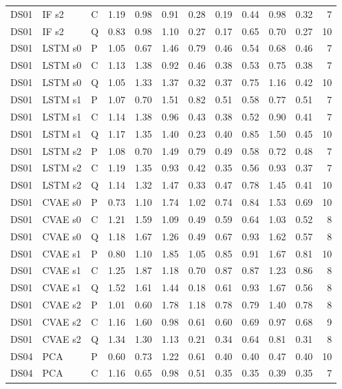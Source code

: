 \documentclass[10pt]{article}
\begin{document}
{\begin{longtable}{lllrrrrrrrrr}
DS01 & IF s2 & C & 1.19 & 0.98 & 0.91 & 0.28 & 0.19 & 0.44 & 0.98 & 0.32 & 7 \\
DS01 & IF s2 & Q & 0.83 & 0.98 & 1.10 & 0.27 & 0.17 & 0.65 & 0.70 & 0.27 & 10 \\
DS01 & LSTM s0 & P & 1.05 & 0.67 & 1.46 & 0.79 & 0.46 & 0.54 & 0.68 & 0.46 & 7 \\
DS01 & LSTM s0 & C & 1.13 & 1.38 & 0.92 & 0.46 & 0.38 & 0.53 & 0.75 & 0.38 & 7 \\
DS01 & LSTM s0 & Q & 1.05 & 1.33 & 1.37 & 0.32 & 0.37 & 0.75 & 1.16 & 0.42 & 10 \\
DS01 & LSTM s1 & P & 1.07 & 0.70 & 1.51 & 0.82 & 0.51 & 0.58 & 0.77 & 0.51 & 7 \\
DS01 & LSTM s1 & C & 1.14 & 1.38 & 0.96 & 0.43 & 0.38 & 0.52 & 0.90 & 0.41 & 7 \\
DS01 & LSTM s1 & Q & 1.17 & 1.35 & 1.40 & 0.23 & 0.40 & 0.85 & 1.50 & 0.45 & 10 \\
DS01 & LSTM s2 & P & 1.08 & 0.70 & 1.49 & 0.79 & 0.49 & 0.58 & 0.72 & 0.48 & 7 \\
DS01 & LSTM s2 & C & 1.19 & 1.35 & 0.93 & 0.42 & 0.35 & 0.56 & 0.93 & 0.37 & 7 \\
DS01 & LSTM s2 & Q & 1.14 & 1.32 & 1.47 & 0.33 & 0.47 & 0.78 & 1.45 & 0.41 & 10 \\
DS01 & CVAE s0 & P & 0.73 & 1.10 & 1.74 & 1.02 & 0.74 & 0.84 & 1.53 & 0.69 & 10 \\
DS01 & CVAE s0 & C & 1.21 & 1.59 & 1.09 & 0.49 & 0.59 & 0.64 & 1.03 & 0.52 & 8 \\
DS01 & CVAE s0 & Q & 1.18 & 1.67 & 1.26 & 0.49 & 0.67 & 0.93 & 1.62 & 0.57 & 8 \\
DS01 & CVAE s1 & P & 0.80 & 1.10 & 1.85 & 1.05 & 0.85 & 0.91 & 1.67 & 0.81 & 10 \\
DS01 & CVAE s1 & C & 1.25 & 1.87 & 1.18 & 0.70 & 0.87 & 0.87 & 1.23 & 0.86 & 8 \\
DS01 & CVAE s1 & Q & 1.52 & 1.61 & 1.44 & 0.18 & 0.61 & 0.93 & 1.67 & 0.56 & 8 \\
DS01 & CVAE s2 & P & 1.01 & 0.60 & 1.78 & 1.18 & 0.78 & 0.79 & 1.40 & 0.78 & 8 \\
DS01 & CVAE s2 & C & 1.16 & 1.60 & 0.98 & 0.61 & 0.60 & 0.69 & 0.97 & 0.68 & 9 \\
DS01 & CVAE s2 & Q & 1.34 & 1.30 & 1.13 & 0.21 & 0.34 & 0.64 & 0.81 & 0.31 & 8 \\
\midrule
DS04 & PCA & P & 0.60 & 0.73 & 1.22 & 0.61 & 0.40 & 0.40 & 0.47 & 0.40 & 10 \\
DS04 & PCA & C & 1.16 & 0.65 & 0.98 & 0.51 & 0.35 & 0.35 & 0.39 & 0.35 & 7 \\

\end{longtable}}
\end{document}

